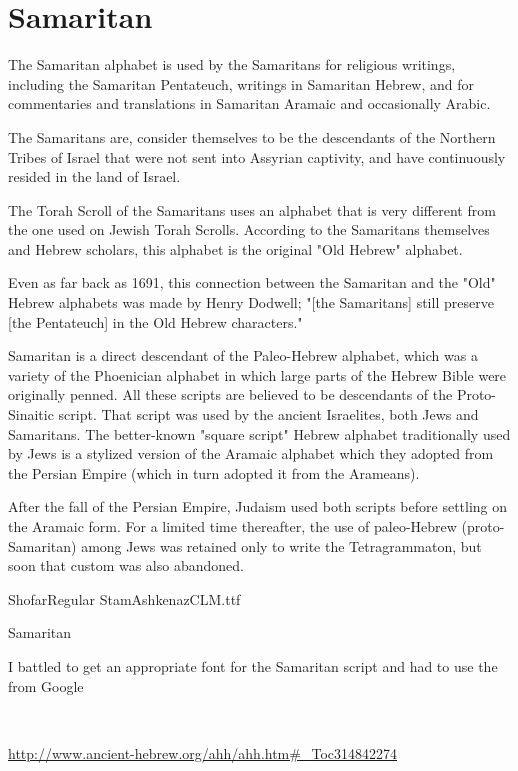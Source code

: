 \section{Samaritan}
\newfontfamily{}

The Samaritan alphabet is used by the Samaritans for religious writings, including the Samaritan Pentateuch, writings in Samaritan Hebrew, and for commentaries and translations in Samaritan Aramaic and occasionally Arabic.

The Samaritans are, consider themselves to be the descendants of the Northern Tribes of Israel that were not sent into Assyrian captivity, and have continuously resided in the land of Israel.

The Torah Scroll of the Samaritans uses an alphabet that is very different from the one used on Jewish Torah Scrolls. According to the Samaritans themselves and Hebrew scholars, this alphabet is the original "Old Hebrew" alphabet.

Even as far back as 1691, this connection between the Samaritan and the "Old" Hebrew alphabets was made by Henry Dodwell; "[the Samaritans] still preserve [the Pentateuch] in the Old Hebrew characters."

Samaritan is a direct descendant of the Paleo-Hebrew alphabet, which was a variety of the Phoenician alphabet in which large parts of the Hebrew Bible were originally penned. All these scripts are believed to be descendants of the Proto-Sinaitic script. That script was used by the ancient Israelites, both Jews and Samaritans. The better-known "square script" Hebrew alphabet traditionally used by Jews is a stylized version of the Aramaic alphabet which they adopted from the Persian Empire (which in turn adopted it from the Arameans). 

After the fall of the Persian Empire, Judaism used both scripts before settling on the Aramaic form. For a limited time thereafter, the use of paleo-Hebrew (proto-Samaritan) among Jews was retained only to write the Tetragrammaton, but soon that custom was also abandoned.



ShofarRegular StamAshkenazCLM.ttf

\begin{scriptexample}[]{Samaritan}
\bgroup
{}
\egroup
{}
\end{scriptexample}

I battled to get an appropriate font for the Samaritan script and had to use the  from Google


^^A


\url{http://www.ancient-hebrew.org/ahh/ahh.htm#_Toc314842274}


